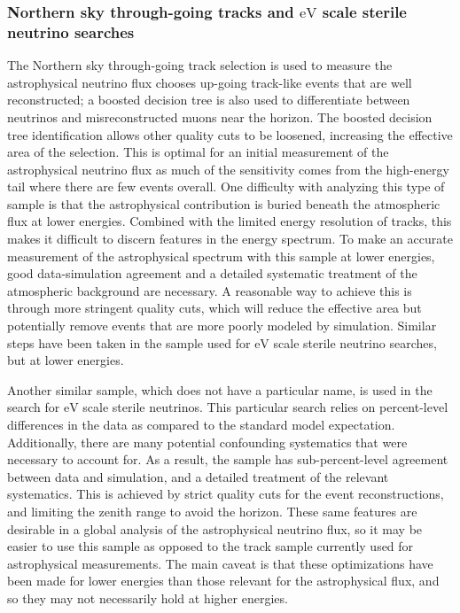 \subsubsection{Northern sky through-going tracks and $\si\eV$ scale sterile neutrino searches}
The Northern sky through-going track selection is used to measure the astrophysical neutrino flux chooses up-going track-like events that are well reconstructed; a boosted decision tree is also used to differentiate between neutrinos and misreconstructed muons near the horizon.
The boosted decision tree identification allows other quality cuts to be loosened, increasing the effective area of the selection.
This is optimal for an initial measurement of the astrophysical neutrino flux as much of the sensitivity comes from the high-energy tail where there are few events overall.
One difficulty with analyzing this type of sample is that the astrophysical contribution is buried beneath the atmospheric flux at lower energies.
Combined with the limited energy resolution of tracks, this makes it difficult to discern features in the energy spectrum.
To make an accurate measurement of the astrophysical spectrum with this sample at lower energies, good data-simulation agreement and a detailed systematic treatment of the atmospheric background are necessary.
A reasonable way to achieve this is through more stringent quality cuts, which will reduce the effective area but potentially remove events that are more poorly modeled by simulation.
Similar steps have been taken in the sample used for $\si\eV$ scale sterile neutrino searches, but at lower energies.

Another similar sample, which does not have a particular name, is used in the search for $\si\eV$ scale sterile neutrinos.
This particular search relies on percent-level differences in the data as compared to the standard model expectation.
Additionally, there are many potential confounding systematics that were necessary to account for.
As a result, the sample has sub-percent-level agreement between data and simulation, and a detailed treatment of the relevant systematics.
This is achieved by strict quality cuts for the event reconstructions, and limiting the zenith range to avoid the horizon.
These same features are desirable in a global analysis of the astrophysical neutrino flux, so it may be easier to use this sample as opposed to the track sample currently used for astrophysical measurements.
The main caveat is that these optimizations have been made for lower energies than those relevant for the astrophysical flux, and so they may not necessarily hold at higher energies.

